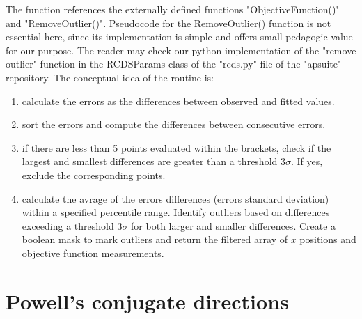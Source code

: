 The function references the externally defined functions "ObjectiveFunction()" and "RemoveOutlier()". Pseudocode for the RemoveOutlier() function is not essential here, since its implementation is simple and offers small pedagogic value for our purpose. The reader may check our python implementation of  the "remove outlier" function in the RCDSParams class of the "rcds.py" file of the "apsuite" repository. The conceptual idea of the routine is:
\begin{enumerate}
    \item calculate the errors as the differences between observed and fitted values.
    \item sort the errors and compute the differences between consecutive errors.
    \item if there are less than 5 points evaluated within the brackets, check if the largest and smallest differences are greater than a threshold $3\sigma$. If yes, exclude the corresponding points.
    \item calculate the avrage of the errors differences (errors standard deviation) within a specified percentile range. Identify outliers based on differences exceeding a threshold $3\sigma$ for both larger and smaller differences. Create a boolean mask to mark outliers and return the filtered array of $x$ positions and objective function measurements.
\end{enumerate}

\section{Powell's conjugate directions}
